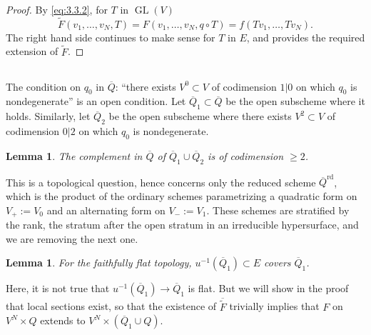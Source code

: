 \documentclass[11pt,a4paper]{article}
\theoremstyle{plain}
\newtheorem{lemma}[theorem]{Lemma}
\theoremstyle{definition}
\DeclareMathOperator{\GL}{GL}
\begin{document}
\begin{proof}
By \eqref{eq:3.3.2}, for $T$ in $\GL(V)$
\[
\widetilde{F}(v_1,\dots,v_N,T) = F(v_1,\dots,v_N, q \circ T) = f(Tv_1,\dots,Tv_N).
\]
The right hand side continues to make sense for $T$ in $E$, and provides the required extension of $\widetilde{F}$.
\end{proof}

\subsection{}
The condition on $q_0$ in $\overline{Q}$: ``there exists $V^0 \subset V$ of codimension $1|0$ on which $q_0$ is nondegenerate'' is an open condition. Let $\overline{Q}_1 \subset \overline{Q}$ be the open subscheme where it holds. Similarly, let $\overline{Q}_2$ be the open subscheme where there exists $V^2 \subset V$ of codimension $0|2$ on which $q_0$ is nondegenerate.

\begin{lemma}\label{lem:3.8}
The complement in $\overline{Q}$ of $\overline{Q}_1 \cup \overline{Q}_2$ is of codimension $\geq 2$.
\end{lemma}

This is a topological question, hence concerns only the reduced scheme $\overline{Q}^{\mathrm{rd}}$, which is the product of the ordinary schemes parametrizing a quadratic form on $V_+ := V_0$ and an alternating form on $V_- := V_1$. These schemes are stratified by the rank, the stratum after the open stratum in an irreducible hypersurface, and we are removing the next one.

\begin{lemma}\label{lem:3.9}
For the faithfully flat topology, $u^{-1}(\overline{Q}_1) \subset E$ covers $\overline{Q}_1$.
\end{lemma}

Here, it is not true that $u^{-1}(\overline{Q}_1) \to \overline{Q}_1$ is flat. But we will show in the proof that local sections exist, so that the existence of $\overline{\widetilde{F}}$ trivially implies that $F$ on $V^N \times Q$ extends to $V^N \times (\overline{Q}_1 \cup Q)$.
\end{document}
